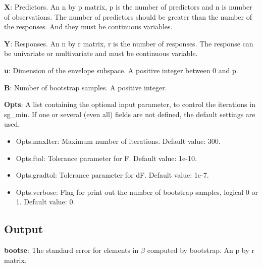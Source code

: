 \documentclass[a4paper,11pt,openany]{memoir}
\begin{document}
\begin{par}
\textbf{X}: Predictors. An n by p matrix, p is the number of predictors and n is number of observations. The number of predictors should be greater than the number of the responses. And they must be continuous variables.
\end{par} \vspace{1em}
\begin{par}
\textbf{Y}: Responses. An n by r matrix, r is the number of responses. The response can be univariate or multivariate and must be continuous variable.
\end{par} \vspace{1em}
\begin{par}
\textbf{u}: Dimension of the envelope subspace.  A positive integer between 0 and p.
\end{par} \vspace{1em}
\begin{par}
\textbf{B}: Number of bootstrap samples.  A positive integer.
\end{par} \vspace{1em}
\begin{par}
\textbf{Opts}: A list containing the optional input parameter, to control the iterations in sg\_min. If one or several (even all) fields are not defined, the default settings are used.
\end{par} \vspace{1em}
\begin{itemize}
\setlength{\itemsep}{-1ex}
   \item Opts.maxIter: Maximum number of iterations.  Default value: 300.
   \item Opts.ftol: Tolerance parameter for F.  Default value: 1e-10.
   \item Opts.gradtol: Tolerance parameter for dF.  Default value: 1e-7.
   \item Opts.verbose: Flag for print out the number of bootstrap samples, logical 0 or 1. Default value: 0.
\end{itemize}


\subsection*{Output}

\begin{par}
\textbf{bootse}: The standard error for elements in $\beta$ computed by bootstrap.  An p by r matrix.
\end{par} \vspace{1em}
\end{document}
